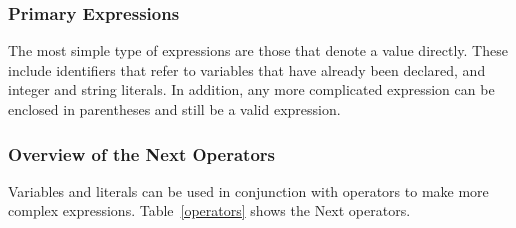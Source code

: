 \documentclass[12pt]{article}
\begin{document}
\subsubsection{Primary Expressions}
The most simple type of expressions are those that denote a value directly.  These include identifiers that refer to variables that have already been declared, and integer and string literals.  In addition, any more complicated expression can be enclosed in parentheses and still be a valid expression.

\subsubsection{Overview of the Next Operators}
Variables and literals can be used in conjunction with operators to make more complex expressions.  Table~\ref{operators} shows the Next operators. \\
\end{document}
